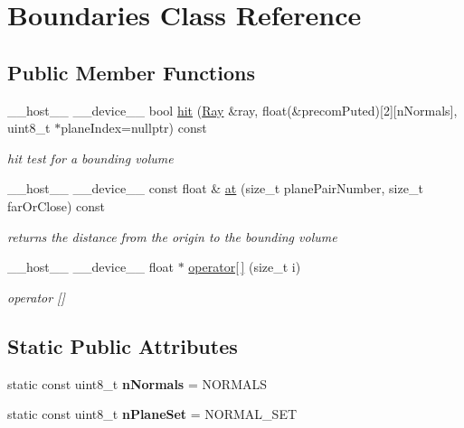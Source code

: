 \hypertarget{class_boundaries}{}\section{Boundaries Class Reference}
\label{class_boundaries}
\subsection*{Public Member Functions}
\begin{DoxyCompactItemize}
\item 
\+\_\+\+\_\+host\+\_\+\+\_\+ \+\_\+\+\_\+device\+\_\+\+\_\+ bool \hyperlink{class_boundaries_ac48b60bf0de75404bb222098a890f20c}{hit} (\hyperlink{class_ray}{Ray} \&ray, float(\&precom\+Puted)\mbox{[}2\mbox{]}\mbox{[}n\+Normals\mbox{]}, uint8\+\_\+t $\ast$plane\+Index=nullptr) const
\begin{DoxyCompactList}\small\item\em hit test for a bounding volume \end{DoxyCompactList}\item 
\+\_\+\+\_\+host\+\_\+\+\_\+ \+\_\+\+\_\+device\+\_\+\+\_\+ const float \& \hyperlink{class_boundaries_a266ff06f5e1ba1f5bc69ddf8c9506186}{at} (size\+\_\+t plane\+Pair\+Number, size\+\_\+t far\+Or\+Close) const
\begin{DoxyCompactList}\small\item\em returns the distance from the origin to the bounding volume \end{DoxyCompactList}\item 
\+\_\+\+\_\+host\+\_\+\+\_\+ \+\_\+\+\_\+device\+\_\+\+\_\+ float $\ast$ \hyperlink{class_boundaries_a76d14c4bc0572159b449b47e29987690}{operator\mbox{[}$\,$\mbox{]}} (size\+\_\+t i)
\begin{DoxyCompactList}\small\item\em operator \mbox{[}\mbox{]} \end{DoxyCompactList}\end{DoxyCompactItemize}
\subsection*{Static Public Attributes}
\begin{DoxyCompactItemize}
\item 
static const uint8\+\_\+t {\bfseries n\+Normals} = N\+O\+R\+M\+A\+LS\hypertarget{class_boundaries_af0ee69c3dcc945e8e3eb5f5aa7210aae}{}\label{class_boundaries_af0ee69c3dcc945e8e3eb5f5aa7210aae}

\item 
static const uint8\+\_\+t {\bfseries n\+Plane\+Set} = N\+O\+R\+M\+A\+L\+\_\+\+S\+ET\hypertarget{class_boundaries_aee71213c990abbe66a7fbc1f694c5ebb}{}\label{class_boundaries_aee71213c990abbe66a7fbc1f694c5ebb}

\end{DoxyCompactItemize}


